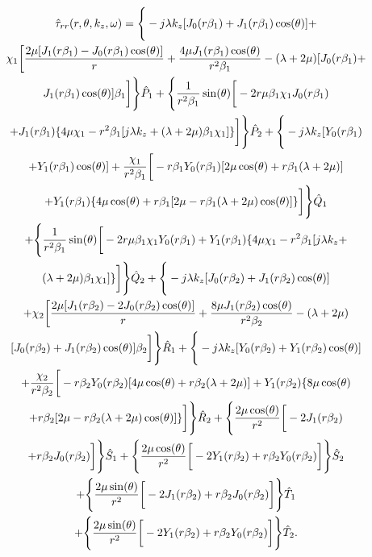 \documentclass[10pt]{asme2ej}
\begin{document}
    \begin{multline}\label{normal stress r,r 3d appendix}
        \Hat{\tau}_{rr}(r,\theta,k_z,\omega) = \Bigg\{-j\lambda k_z[J_0(r\beta_1)+J_1(r\beta_1)\cos(\theta)] +\\ \chi_1 \bigg[\frac{2\mu[J_1(r\beta_1)-J_0(r\beta_1)\cos(\theta)]}{r} + \frac{4\mu J_1(r\beta_1)\cos(\theta)}{r^2 \beta_1} - (\lambda+2\mu)[J_0(r\beta_1)+\\ J_1(r\beta_1)\cos(\theta)]\beta_1 \bigg]\Bigg\}\Hat{P}_1 + \Bigg\{\frac{1}{r^2\beta_1}\sin(\theta)\bigg[-2r\mu \beta_1 \chi_1 J_0(r\beta_1)\\ + J_1(r\beta_1)\{4\mu \chi_1-r^2\beta_1[j\lambda k_z + (\lambda+2\mu)\beta_1 \chi_1]\}\bigg]\Bigg\}\Hat{P}_2 + \Bigg\{-j\lambda k_z[Y_0(r\beta_1)\\+Y_1(r\beta_1)\cos(\theta)] + \frac{\chi_1}{r^2\beta_1}\bigg[-r\beta_1 Y_0(r\beta_1)[2\mu\cos(\theta)+r\beta_1(\lambda+2\mu)]\\ + Y_1(r\beta_1)\{4\mu\cos(\theta) + r\beta_1[2\mu - r\beta_1(\lambda+2\mu)\cos(\theta)]\}\bigg]\Bigg\}\Hat{Q}_1\\ + \Bigg\{\frac{1}{r^2\beta_1}\sin(\theta)\bigg[-2r\mu \beta_1 \chi_1 Y_0(r\beta_1) + Y_1(r\beta_1)\{4\mu \chi_1-r^2\beta_1[j\lambda k_z +\\ (\lambda+2\mu)\beta_1 \chi_1]\}\bigg]\Bigg\}\Hat{Q}_2 + \Bigg\{-j\lambda k_z[J_0(r\beta_2)+J_1(r\beta_2)\cos(\theta)]\\ + \chi_2 \bigg[\frac{2\mu[J_1(r\beta_2)-2J_0(r\beta_2)\cos(\theta)]}{r} + \frac{8\mu J_1(r\beta_2)\cos(\theta)}{r^2 \beta_2} - (\lambda+2\mu)\\ [J_0(r\beta_2)+J_1(r\beta_2)\cos(\theta)]\beta_2 \bigg]\Bigg\}\Hat{R}_1 +  \Bigg\{-j\lambda k_z[Y_0(r\beta_2)+Y_1(r\beta_2)\cos(\theta)]\\ + \frac{\chi_2}{r^2\beta_2}\bigg[-r\beta_2 Y_0(r\beta_2)[4\mu\cos(\theta)+r\beta_2(\lambda+2\mu)] + Y_1(r\beta_2)\{8\mu\cos(\theta)\\ + r\beta_2[2\mu - r\beta_2(\lambda+2\mu)\cos(\theta)]\}\bigg]\Bigg\}\Hat{R}_2 + \Bigg\{\frac{2\mu\cos(\theta)}{r^2}\bigg[-2J_1(r\beta_2)\\ + r\beta_2J_0(r\beta_2)\bigg]\Bigg\}\Hat{S}_1 + \Bigg\{\frac{2\mu\cos(\theta)}{r^2}\bigg[-2Y_1(r\beta_2) + r\beta_2Y_0(r\beta_2)\bigg]\Bigg\}\Hat{S}_2\\ + \Bigg\{\frac{2\mu\sin(\theta)}{r^2}\bigg[-2J_1(r\beta_2) + r\beta_2J_0(r\beta_2)\bigg]\Bigg\}\Hat{T}_1\\ + \Bigg\{\frac{2\mu\sin(\theta)}{r^2}\bigg[-2Y_1(r\beta_2) + r\beta_2Y_0(r\beta_2)\bigg]\Bigg\}\Hat{T}_2.
    \end{multline}
\end{document}
